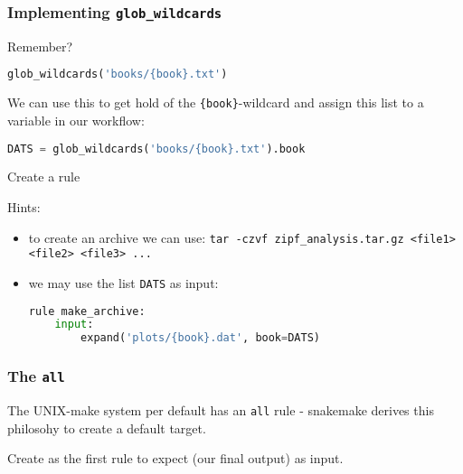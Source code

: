 \begin{frame}[fragile]
  \frametitle{Implementing \texttt{glob\_wildcards}}
  Remember?
  \begin{lstlisting}[language=Python,style=Python,basicstyle=\tiny]
glob_wildcards('books/{book}.txt')
  \end{lstlisting}
  \pause
  We can use this to get hold of the \texttt{\{book\}}-wildcard and assign this list to a variable in our workflow:
  \begin{lstlisting}[language=Python,style=Python,basicstyle=\tiny]
DATS = glob_wildcards('books/{book}.txt').book
  \end{lstlisting}
  \begin{task}
  	Create a rule 
  \end{task}
  \footnotesize
  Hints:
      \begin{itemize}
       \item to create an archive we can use: \texttt{tar -czvf zipf\_analysis.tar.gz <file1> <file2> <file3> ...}
       \item we may use the list \texttt{DATS} as input:
          \begin{lstlisting}[language=Python,style=Python,basicstyle=\tiny]
rule make_archive:
    input:
        expand('plots/{book}.dat', book=DATS)
          \end{lstlisting}
      \end{itemize}
\end{frame}

\begin{frame}[fragile]
  \frametitle{The \texttt{all}}
  The UNIX-make system per default has an \texttt{all} rule - snakemake derives this philosohy to create a default target.
  \begin{task}
  	Create  as the first rule to expect  (our final output) as input.
  \end{task}
\end{frame}



